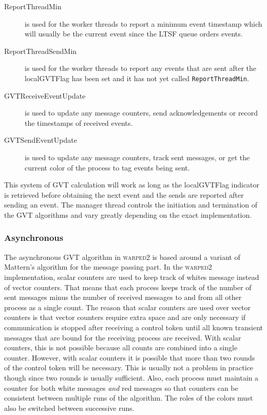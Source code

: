 \documentclass[11pt]{book}
\begin{document}
\begin{description}
    \item[ReportThreadMin ] is used for the worker threads to report a minimum event timestamp which
      will usually be the current event since the LTSF queue orders events.
    \item[ReportThreadSendMin ] is used for the worker threads to report any events that are sent
      after the localGVTFlag has been set and it has not yet called \texttt{ReportThreadMin}.
    \item[GVTReceiveEventUpdate ] is used to update any message counters, send acknowledgements or
      record the timestamps of received events.
    \item[GVTSendEventUpdate ] is used to update any message counters, track sent messages, or get
      the current color of the process to tag events being sent.
\end{description}

\noindent
This system of GVT calculation will work as long as the localGVTFlag indicator is retrieved before
obtaining the next event and the sends are reported after sending an event.  The manager thread
controls the initiation and termination of the GVT algorithms and vary greatly depending on the
exact implementation.

\subsubsection{Asynchronous}

The asynchronous GVT algorithm in \textsc{warped2} is based around a variant of Mattern's algorithm
\cite{mattern-93} for the message passing part.  In the \textsc{warped2} implementation, scalar
counters are used to keep track of whites message instead of vector counters.  That means that each
process keeps track of the number of sent messages minus the number of received messages to and from
all other process as a single count.  The reason that scalar counters are used over vector counters
is that vector counters require extra space and are only necessary if communication is stopped after
receiving a control token until all known transient messages that are bound for the receiving
process are received.  With scalar counters, this is not possible because all counts are combined
into a single counter.  However, with scalar counters it is possible that more than two rounds of
the control token will be necessary.  This is usually not a problem in practice though since two
rounds is usually sufficient.  Also, each process must maintain a counter for both white messages
\emph{and} red messages so that counters can be consistent between multiple runs of the algorithm.
The roles of the colors must also be switched between successive runs.
\end{document}
